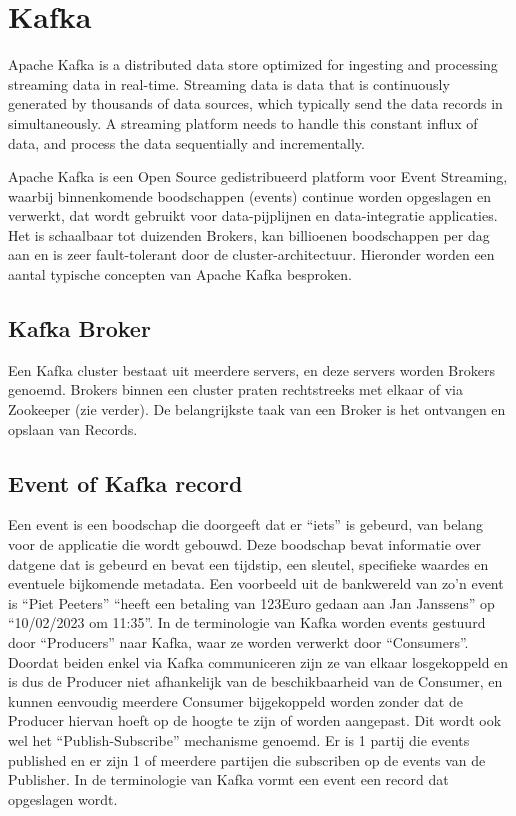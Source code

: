 \section{Kafka}
Apache Kafka is a distributed data store optimized for ingesting and processing streaming data in real-time. Streaming data is data that is continuously generated by thousands of data sources, which typically send the data records in simultaneously. A streaming platform needs to handle this constant influx of data, and process the data sequentially and incrementally.
\autocite{AwsAmazon2023b}

Apache Kafka is een Open Source gedistribueerd platform voor Event Streaming, waarbij binnenkomende boodschappen (events) continue worden opgeslagen en verwerkt, dat wordt gebruikt voor data-pijplijnen en data-integratie applicaties. Het is schaalbaar tot duizenden Brokers, kan billioenen boodschappen per dag aan en is zeer fault-tolerant door de cluster-architectuur. Hieronder worden een aantal typische concepten van Apache Kafka besproken.
\autocite{ASF2022b}

\subsection{Kafka Broker}
Een Kafka cluster bestaat uit meerdere servers, en deze servers worden Brokers genoemd. Brokers binnen een cluster praten rechtstreeks met elkaar of via Zookeeper (zie verder).
De belangrijkste taak van een Broker is het ontvangen en opslaan van Records.\autocite{GitBook2023}

\subsection{Event of Kafka record}
Een event is een boodschap die doorgeeft dat er ``iets'' is gebeurd, van belang voor de applicatie die wordt gebouwd. Deze boodschap bevat informatie over datgene dat is gebeurd en bevat een tijdstip, een sleutel, specifieke waardes en eventuele bijkomende metadata. Een voorbeeld uit de bankwereld van zo'n event is ``Piet Peeters'' ``heeft een betaling van 123Euro gedaan aan Jan Janssens'' op ``10/02/2023 om 11:35''.
In de terminologie van Kafka worden events gestuurd door ``Producers'' naar Kafka, waar ze worden verwerkt door ``Consumers''. Doordat beiden enkel via Kafka communiceren zijn ze van elkaar losgekoppeld en is dus de Producer niet afhankelijk van de beschikbaarheid van de Consumer, en kunnen eenvoudig meerdere Consumer bijgekoppeld worden zonder dat de Producer hiervan hoeft op de hoogte te zijn of worden aangepast. Dit wordt ook wel het ``Publish-Subscribe'' mechanisme genoemd. Er is 1 partij die events published en er zijn 1 of meerdere partijen die subscriben op de events van de Publisher.
In de terminologie van Kafka vormt een event een record dat opgeslagen wordt.
\autocite{Kafka2023}


